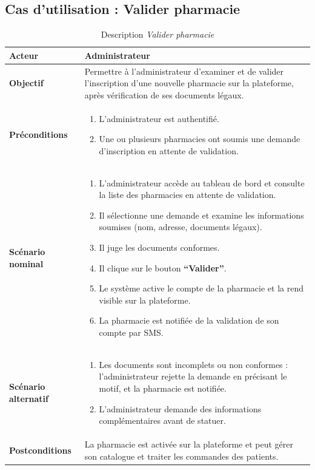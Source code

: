 \documentclass[12pt,a4paper]{report}
\begin{document}
\subsection*{Cas d'utilisation : Valider pharmacie}

\begin{table}[H]
    \centering
    \begin{tabular}{|p{4cm}|p{9cm}|}
        \hline
        \textbf{Acteur} & Administrateur \\
        \hline
        \textbf{Objectif} & Permettre à l'administrateur d'examiner et de valider l'inscription d'une nouvelle pharmacie sur la plateforme, après vérification de ses documents légaux. \\
        \hline
        \textbf{Préconditions} &
        \begin{enumerate}
            \item L'administrateur est authentifié.
            \item Une ou plusieurs pharmacies ont soumis une demande d'inscription en attente de validation.
        \end{enumerate} \\
        \hline
        \textbf{Scénario nominal} &
        \begin{enumerate}
            \item L'administrateur accède au tableau de bord et consulte la liste des pharmacies en attente de validation.
            \item Il sélectionne une demande et examine les informations soumises (nom, adresse, documents légaux).
            \item Il juge les documents conformes.
            \item Il clique sur le bouton \textbf{``Valider''}.
            \item Le système active le compte de la pharmacie et la rend visible sur la plateforme.
            \item La pharmacie est notifiée de la validation de son compte par SMS.
        \end{enumerate} \\
        \hline
        \textbf{Scénario alternatif} &
        \begin{enumerate}
            \item[3.a] Les documents sont incomplets ou non conformes : l'administrateur rejette la demande en précisant le motif, et la pharmacie est notifiée.
            \item[3.b] L'administrateur demande des informations complémentaires avant de statuer.
        \end{enumerate} \\
        \hline
        \textbf{Postconditions} & La pharmacie est activée sur la plateforme et peut gérer son catalogue et traiter les commandes des patients. \\
        \hline
    \end{tabular}
    \caption{Description \textit{Valider pharmacie}}
\end{table}
\end{document}
